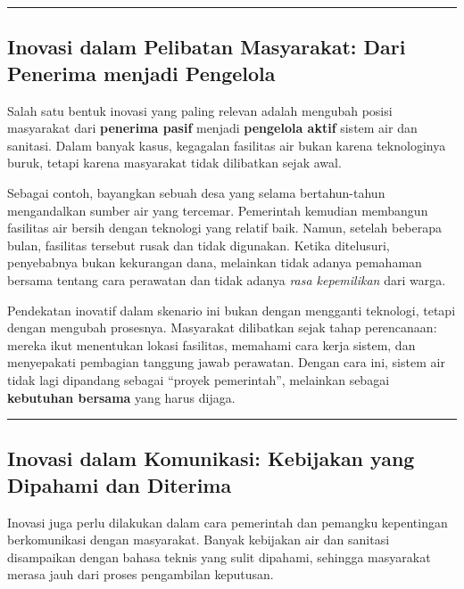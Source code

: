 \documentclass[
  letterpaper,
  DIV=11,
  numbers=noendperiod]{scrreprt}
\begin{document}
\begin{center}\rule{0.5\linewidth}{0.5pt}\end{center}

\subsection{Inovasi dalam Pelibatan Masyarakat: Dari Penerima menjadi
Pengelola}\label{inovasi-dalam-pelibatan-masyarakat-dari-penerima-menjadi-pengelola}

Salah satu bentuk inovasi yang paling relevan adalah mengubah posisi
masyarakat dari \textbf{penerima pasif} menjadi \textbf{pengelola aktif}
sistem air dan sanitasi. Dalam banyak kasus, kegagalan fasilitas air
bukan karena teknologinya buruk, tetapi karena masyarakat tidak
dilibatkan sejak awal.

Sebagai contoh, bayangkan sebuah desa yang selama bertahun-tahun
mengandalkan sumber air yang tercemar. Pemerintah kemudian membangun
fasilitas air bersih dengan teknologi yang relatif baik. Namun, setelah
beberapa bulan, fasilitas tersebut rusak dan tidak digunakan. Ketika
ditelusuri, penyebabnya bukan kekurangan dana, melainkan tidak adanya
pemahaman bersama tentang cara perawatan dan tidak adanya \emph{rasa
kepemilikan} dari warga.

Pendekatan inovatif dalam skenario ini bukan dengan mengganti teknologi,
tetapi dengan mengubah prosesnya. Masyarakat dilibatkan sejak tahap
perencanaan: mereka ikut menentukan lokasi fasilitas, memahami cara
kerja sistem, dan menyepakati pembagian tanggung jawab perawatan. Dengan
cara ini, sistem air tidak lagi dipandang sebagai ``proyek pemerintah'',
melainkan sebagai \textbf{kebutuhan bersama} yang harus dijaga.

\begin{center}\rule{0.5\linewidth}{0.5pt}\end{center}

\subsection{Inovasi dalam Komunikasi: Kebijakan yang Dipahami dan
Diterima}\label{inovasi-dalam-komunikasi-kebijakan-yang-dipahami-dan-diterima}

Inovasi juga perlu dilakukan dalam cara pemerintah dan pemangku
kepentingan berkomunikasi dengan masyarakat. Banyak kebijakan air dan
sanitasi disampaikan dengan bahasa teknis yang sulit dipahami, sehingga
masyarakat merasa jauh dari proses pengambilan keputusan.
\end{document}
